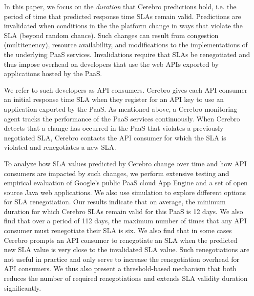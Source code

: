 In this paper, we focus on the \textit{duration} that Cerebro predictions hold, i.e. the period
of time that predicted response time SLAs remain valid.  Predictions are invalidated
when conditions in the the platform change in ways that violate the SLA (beyond random
chance).  Such changes can result from congestion (multitenency), resource availability, 
and modifications to the implementations of the underlying PaaS services. Invalidations 
require that SLAs be renegotiated and thus impose overhead on developers that use the 
web APIs exported by applications hosted by the PaaS.

We refer to such developers as API consumers.  Cerebro gives each API consumer an initial 
response time SLA when they register for an API key to use an application exported by the PaaS.
As mentioned above, a Cerebro monitoring agent tracks the performance of the PaaS services 
continuously.  When Cerebro detects that a change has occurred in the PaaS that
violates a previously negotiated SLA, Cerebro contacts the API consumer
for which the SLA is violated and renegotiates a new SLA.

To analyze how SLA values predicted by Cerebro change over time and how API consumers are 
impacted by such changes, we perform extensive testing and empirical evaluation
of Google's public PaaS cloud App Engine and a set of open source Java web applications.  
We also use simulation to explore different options for SLA renegotiation.
Our results indicate that on average, the minimum duration for which Cerebro SLAs 
remain valid for this PaaS is 12 days.  We also find that
over a period of 112 days, the maximum number of times that any API consumer must renegotiate
their SLA is six.  We also find that in some cases Cerebro prompts an API consumer to
renegotiate an SLA when the predicted new SLA value is very close to the invalidated SLA value. 
Such renegotiations are not useful in practice and only serve to increase the renegotiation overhead
for API consumers. We thus also present a threshold-based mechanism that both reduces 
the number of required renegotiations and extends SLA validity duration significantly.